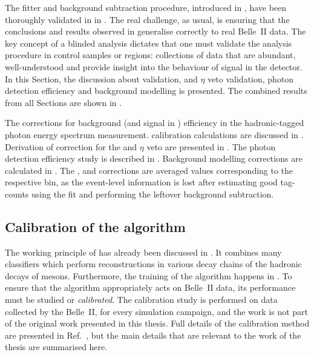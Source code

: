 The fitter and background subtraction procedure, introduced in ,
have been thoroughly validated in  in \MC.
The real challenge, as usual, is ensuring that the conclusions and results observed in \MC generalise correctly to real Belle~II data.
The key concept of a blinded analysis dictates that one must validate the analysis procedure in control samples or regions: collections of data that are abundant, well-understood and provide insight into the behaviour of signal in the detector.
In this Section, the discussion about \FEI validation, 
\piz and $\eta$ veto validation, photon detection efficiency and background modelling is presented.
The combined results from all Sections are shown in .

\begin{table}[htbp!]
    \centering
    \caption{\label{tab:correction_table} The corrections for background (and signal in ) efficiency in the hadronic-tagged \BtoXsgamma photon energy spectrum measurement.
    \FEI calibration calculations are discussed in .
    Derivation of correction for the \piz and $\eta$ veto are presented in .
    The photon detection efficiency study is described in .
    Background modelling corrections are calculated in .
    The \FEI, \piz and \g corrections are averaged values corresponding to the respective \EB bin,
    as the event-level information is lost after estimating good tag-\B counts using the \Mbc fit and performing the leftover \BB background subtraction.
    }
    
\end{table}


\subsection{Calibration of the \texorpdfstring{\FEI}{FEI} algorithm}\label{sec:fei_calibration}

The working principle of \FEI has already been discussed in .
It combines many classifiers which perform reconstructions in various decay chains of the hadronic decays of \B mesons.
Furthermore, the training of the algorithm happens in \MC.
To ensure that the algorithm appropriately acts on Belle~II data, its performance must be studied or \textit{calibrated}.
The calibration study is performed on data collected by the Belle~II, for every simulation campaign, and the work is not part of the original work presented in this thesis.
Full details of the calibration method are presented in Ref.~\cite{Belle-II:2020fst}, but the main details that are relevant to the work of the thesis are summarised here.

